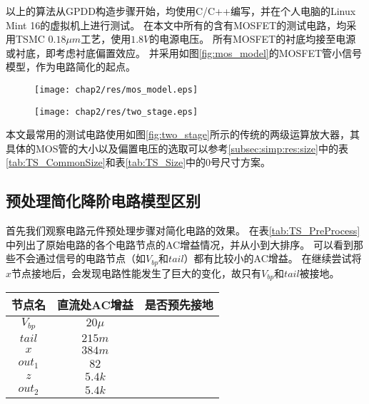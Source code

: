 以上的算法从GPDD构造步骤开始，均使用C/C++编写，并在个人电脑的Linux Mint 16的虚拟机上进行测试。
在本文中所有的含有MOSFET的测试电路，均采用TSMC $0.18 \mu m$工艺，使用$1.8V$的电源电压。
所有MOSFET的衬底均接至电源或衬底，即考虑衬底偏置效应。
并采用如图\ref{fig:mos_model}的MOSFET管小信号模型，作为电路简化的起点。

\begin{figure}[!htp]
	\centering
	\texttt{[image: chap2/res/mos\_model.eps]}
\end{figure}

\begin{figure}[!htp]
	\centering
	\texttt{[image: chap2/res/two\_stage.eps]}
\end{figure}

本文最常用的测试电路使用如图\ref{fig:two_stage}所示的传统的两级运算放大器，其具体的MOS管的大小以及偏置电压的选取可以参考\ref{subsec:simp:res:size}中的表\ref{tab:TS_CommonSize}和表\ref{tab:TS_Size}中的0号尺寸方案。

\subsection{预处理简化降阶电路模型区别}
\label{subsec:simp:res:pre}

首先我们观察电路元件预处理步骤对简化电路的效果。
在表\ref{tab:TS_PreProcess}中列出了原始电路的各个电路节点的AC增益情况，并从小到大排序。
可以看到那些不会通过信号的电路节点（如$V_{bp}$和$tail$）都有比较小的AC增益。
在继续尝试将$x$节点接地后，会发现电路性能发生了巨大的变化，故只有$V_{bp}$和$tail$被接地。

\begin{table}[!htbp]
	\centering
	\begin{tabular}{c|c|c}
		\hline
		  节点名    & 直流处AC增益 &   是否预先接地   \\ \hline
		$V_{bp}$ & $20\mu$ & \checkmark \\
		 $tail$  & $215m$  & \checkmark \\
		  $x$    & $384m$  & \texttimes \\
		$out_1$  &  $82$   & \texttimes \\
		  $z$    & $5.4k$  & \texttimes \\
		$out_2$  & $5.4k$  & \texttimes \\ \hline
	\end{tabular}
\end{table}

